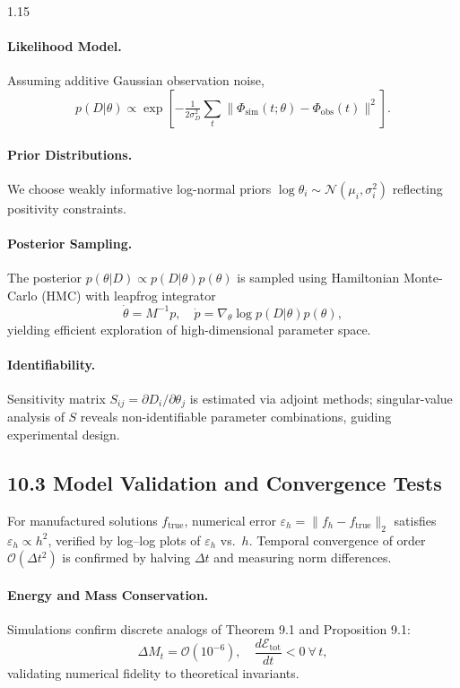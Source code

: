 \documentclass[12pt,a4paper]{article}
\begin{document}
\begin{spacing}{1.15}
\paragraph{Likelihood Model.}
Assuming additive Gaussian observation noise,
\[
p(D|\theta)\propto
  \exp\!\left[-\tfrac{1}{2\sigma_D^2}
   \!\!\sum_t\!\!\|\Phi_{\mathrm{sim}}(t;\theta)-\Phi_{\mathrm{obs}}(t)\|^2\right].
\]
\paragraph{Prior Distributions.}
We choose weakly informative log-normal priors
$\log\theta_i\sim\mathcal{N}(\mu_i,\sigma_i^2)$
reflecting positivity constraints.

\paragraph{Posterior Sampling.}
The posterior
$p(\theta|D)\propto p(D|\theta)p(\theta)$
is sampled using Hamiltonian Monte-Carlo (HMC) with leapfrog integrator
\[
\dot\theta = M^{-1}p,\quad
\dot p = \nabla_\theta\log p(D|\theta)p(\theta),
\]
yielding efficient exploration of high-dimensional parameter space.

\paragraph{Identifiability.}
Sensitivity matrix
$S_{ij}=\partial D_i/\partial \theta_j$
is estimated via adjoint methods; singular-value analysis of $S$ reveals non-identifiable parameter combinations, guiding experimental design.

\subsection{10.3 Model Validation and Convergence Tests}

For manufactured solutions $f_{\text{true}}$, numerical error
$\varepsilon_h=\|f_h-f_{\text{true}}\|_2$
satisfies
$\varepsilon_h\propto h^2$,
verified by log–log plots of $\varepsilon_h$ vs.\ $h$.  
Temporal convergence of order $\mathcal{O}(\Delta t^2)$
is confirmed by halving $\Delta t$ and measuring norm differences.

\paragraph{Energy and Mass Conservation.}
Simulations confirm discrete analogs of Theorem 9.1 and Proposition 9.1:
\[
\Delta M_t=\mathcal{O}(10^{-6}),\quad
\frac{d\mathcal{E}_{\mathrm{tot}}}{dt}<0
\ \forall\,t,
\]
validating numerical fidelity to theoretical invariants.


\end{spacing}
\end{document}
